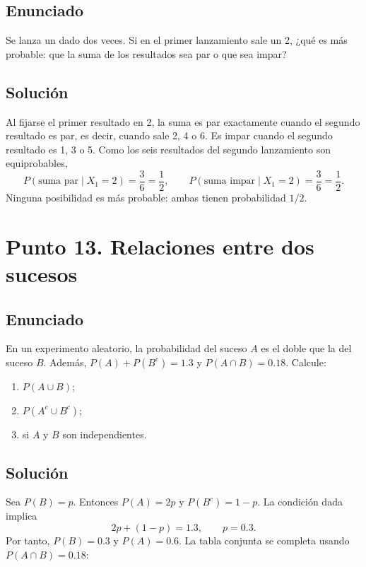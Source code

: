 \documentclass[12pt]{article}
\begin{document}
\subsection*{Enunciado}

Se lanza un dado dos veces. Si en el primer lanzamiento sale un 2, ¿qué es más probable: que la suma de los resultados sea par o que sea impar?

\subsection*{Solución}

Al fijarse el primer resultado en 2, la suma es par exactamente cuando el segundo resultado es par, es decir, cuando sale 2, 4 o 6. Es impar cuando el segundo resultado es 1, 3 o 5. Como los seis resultados del segundo lanzamiento son equiprobables,
\[
P(\text{suma par}\mid X_1=2)=\frac{3}{6}=\frac{1}{2},\qquad
P(\text{suma impar}\mid X_1=2)=\frac{3}{6}=\frac{1}{2}.
\]
Ninguna posibilidad es más probable: ambas tienen probabilidad $1/2$.

\section*{Punto 13. Relaciones entre dos sucesos}

\subsection*{Enunciado}

En un experimento aleatorio, la probabilidad del suceso $A$ es el doble que la del suceso $B$. Además, $P(A)+P(B^c)=1.3$ y $P(A\cap B)=0.18$. Calcule:

\begin{enumerate}
    \item $P(A\cup B)$;
    \item $P(A^c\cup B^c)$;
    \item si $A$ y $B$ son independientes.
\end{enumerate}

\subsection*{Solución}

Sea $P(B)=p$. Entonces $P(A)=2p$ y $P(B^c)=1-p$. La condición dada implica
\[
2p+(1-p)=1.3,\qquad p=0.3.
\]
Por tanto, $P(B)=0.3$ y $P(A)=0.6$. La tabla conjunta se completa usando $P(A\cap B)=0.18$:
\end{document}
